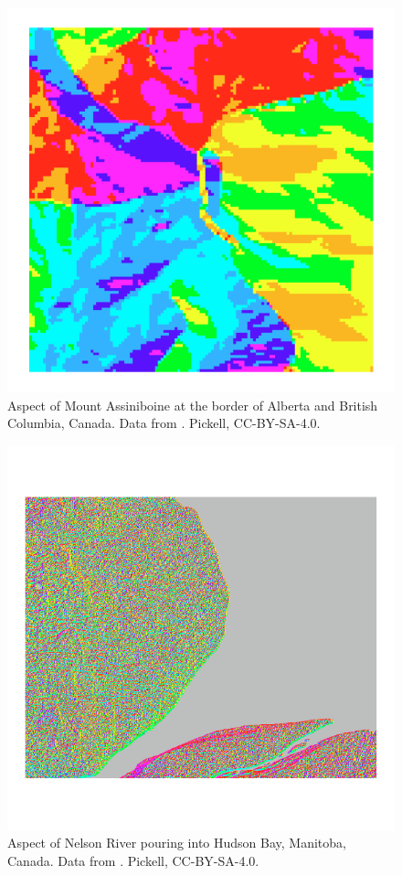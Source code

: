 \documentclass[
]{book}
\begin{document}
\begin{figure}
\includegraphics[width=0.75\linewidth]{images/09-mount-assiniboine-aspect} \caption{Aspect of Mount Assiniboine at the border of Alberta and British Columbia, Canada. Data from \citep{natural_resources_canada_canadian_2015}. Pickell, CC-BY-SA-4.0.}\label{fig:9-mount-assiniboine-aspect}
\end{figure}



\begin{figure}
\includegraphics[width=0.75\linewidth]{images/09-nelson-river-aspect} \caption{Aspect of Nelson River pouring into Hudson Bay, Manitoba, Canada. Data from \citep{earth_resources_observation_and_science_center_usgs_2018}. Pickell, CC-BY-SA-4.0.}\label{fig:9-nelson-river-aspect}
\end{figure}
\end{document}

